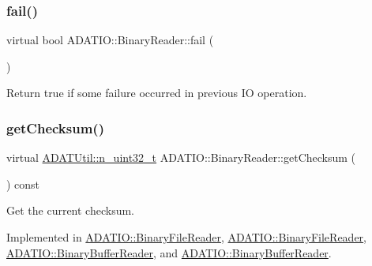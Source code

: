 \subsubsection{\texorpdfstring{fail()}{fail()}\hspace{0.1cm}{\footnotesize\ttfamily [2/2]}}
{\footnotesize\ttfamily virtual bool A\+D\+A\+T\+I\+O\+::\+Binary\+Reader\+::fail (\begin{DoxyParamCaption}{ }\end{DoxyParamCaption})\hspace{0.3cm}{\ttfamily [virtual]}}



Return true if some failure occurred in previous IO operation. 

\mbox{\label{classADATIO_1_1BinaryReader_acd705bb96d557a5437410b55beb40bda}} 
\subsubsection{\texorpdfstring{getChecksum()}{getChecksum()}\hspace{0.1cm}{\footnotesize\ttfamily [1/2]}}
{\footnotesize\ttfamily virtual \mbox{\hyperlink{namespaceADATUtil_ad945a8afa4db2d1f89b731964adae97e}{A\+D\+A\+T\+Util\+::n\+\_\+uint32\+\_\+t}} A\+D\+A\+T\+I\+O\+::\+Binary\+Reader\+::get\+Checksum (\begin{DoxyParamCaption}{ }\end{DoxyParamCaption}) const\hspace{0.3cm}{\ttfamily [pure virtual]}}



Get the current checksum. 



Implemented in \mbox{\hyperlink{classADATIO_1_1BinaryFileReader_addb0cfdf4c3df174327b1abc136cfc68}{A\+D\+A\+T\+I\+O\+::\+Binary\+File\+Reader}}, \mbox{\hyperlink{classADATIO_1_1BinaryFileReader_addb0cfdf4c3df174327b1abc136cfc68}{A\+D\+A\+T\+I\+O\+::\+Binary\+File\+Reader}}, \mbox{\hyperlink{classADATIO_1_1BinaryBufferReader_ae8e6c22be76223f5e2ce2613e70be4bf}{A\+D\+A\+T\+I\+O\+::\+Binary\+Buffer\+Reader}}, and \mbox{\hyperlink{classADATIO_1_1BinaryBufferReader_ae8e6c22be76223f5e2ce2613e70be4bf}{A\+D\+A\+T\+I\+O\+::\+Binary\+Buffer\+Reader}}.

\mbox{\label{classADATIO_1_1BinaryReader_acd705bb96d557a5437410b55beb40bda}} 
